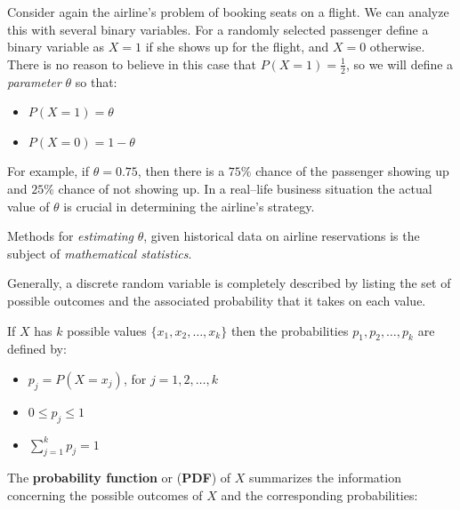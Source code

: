 \documentclass[11pt]{article}
\begin{document}
Consider again the airline's problem of booking seats on a flight.  We can analyze this with several binary variables. For a
randomly selected passenger define a binary variable as $X = 1$ if she shows up for the flight, and $X = 0$ otherwise. There is 
no reason to believe in this case that $P(X = 1) = \frac{1}{2}$, so we will define a \emph{parameter} $\theta$ so that:

\begin{itemize}
 \item[] $P(X = 1) = \theta$
 \item[] $P(X = 0) = 1 - \theta$
\end{itemize}

\vspace{2mm}

For example, if $\theta = 0.75$, then there is a $75\%$ chance of the passenger showing up and $25\%$ chance of not showing up. In a
real--life business situation the actual value of $\theta$ is crucial in determining the airline's strategy.

\vspace{2mm}

Methods for \emph{estimating} $\theta$, given historical data on airline reservations is the subject of \emph{mathematical statistics}.

\vspace{2mm}

Generally, a discrete random variable is completely described by listing the set of possible outcomes and the associated probability
that it takes on each value.

\vspace{2mm}

If $X$ has $k$ possible values $\{x_{1}, x_{2}, \ldots, x_{k}\}$ then the probabilities $p_{1}, p_{2}, \ldots, p_{k}$ are 
defined by:

\begin{itemize}
 \item $p_{j} = P(X = x_{j})$, for $j = 1, 2, \ldots, k$
 \item $0 \leq p_{j} \leq 1$
 \item $\sum\limits_{j=1}^{k} p_{j} = 1$
\end{itemize}

\vspace{2mm}

The \textbf{probability function} or (\textbf{PDF}) of $X$ summarizes the information concerning the possible outcomes of $X$
and the corresponding probabilities:
\end{document}
